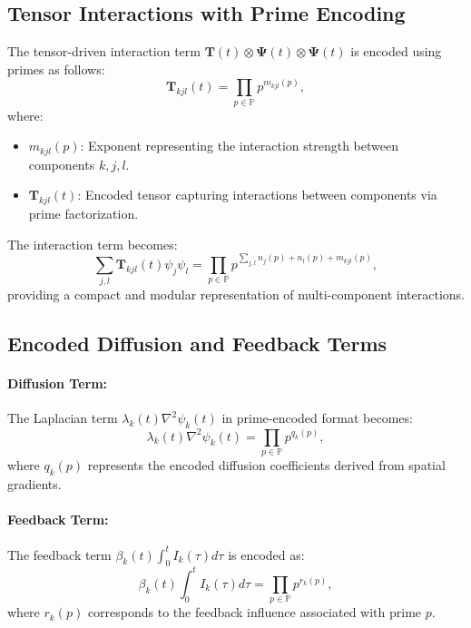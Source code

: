 \documentclass{article}
\theoremstyle{plain}
\begin{document}
\subsection{Tensor Interactions with Prime Encoding}
The tensor-driven interaction term \(\bm{T}(t) \otimes \bm{\Psi}(t) \otimes \bm{\Psi}(t)\) is encoded using primes as follows:
\begin{equation}
\bm{T}_{kjl}(t) = \prod_{p \in \mathbb{P}} p^{m_{kjl}(p)},
\end{equation}
where:
\begin{itemize}
    \item \(m_{kjl}(p)\): Exponent representing the interaction strength between components \(k, j, l\).
    \item \(\bm{T}_{kjl}(t)\): Encoded tensor capturing interactions between components via prime factorization.
\end{itemize}

The interaction term becomes:
\begin{equation}
\sum_{j,l} \bm{T}_{kjl}(t) \psi_j \psi_l = \prod_{p \in \mathbb{P}} p^{\sum_{j,l} n_j(p) + n_l(p) + m_{kjl}(p)},
\end{equation}
providing a compact and modular representation of multi-component interactions.

\subsection{Encoded Diffusion and Feedback Terms}
\paragraph{Diffusion Term:}
The Laplacian term \(\lambda_k(t)\nabla^2 \psi_k(t)\) in prime-encoded format becomes:
\begin{equation}
\lambda_k(t)\nabla^2 \psi_k(t) = \prod_{p \in \mathbb{P}} p^{q_k(p)},
\end{equation}
where \(q_k(p)\) represents the encoded diffusion coefficients derived from spatial gradients.

\paragraph{Feedback Term:}
The feedback term \(\beta_k(t) \int_0^t I_k(\tau) d\tau\) is encoded as:
\begin{equation}
\beta_k(t) \int_0^t I_k(\tau) d\tau = \prod_{p \in \mathbb{P}} p^{r_k(p)},
\end{equation}
where \(r_k(p)\) corresponds to the feedback influence associated with prime \(p\).
\end{document}
